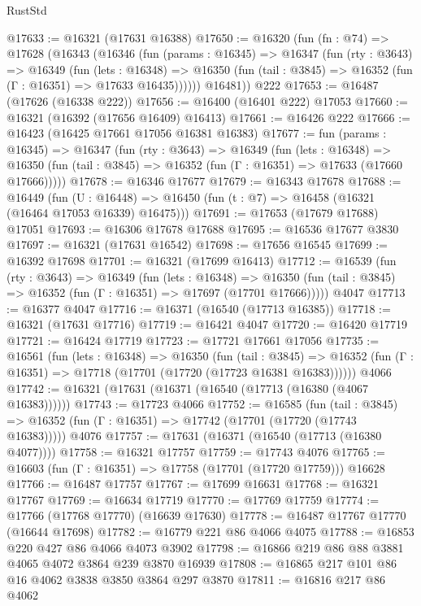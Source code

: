 \begin{lexlean}{RustStd}
\begin{coremodule}
@17633 := @16321 (@17631 @16388)
@17650 := @16320
    (fun (fn : @74) =>
    @17628
      (@16343
        (@16346
          (fun (params : @16345) =>
          @16347
            (fun (rty : @3643) =>
            @16349
              (fun (lets : @16348) =>
              @16350 (fun (tail : @3845) => @16352 (fun (Γ : @16351) => @17633 @16435))))))
        @16481))
    @222
@17653 := @16487 (@17626 (@16338 @222))
@17656 := @16400 (@16401 @222) @17053
@17660 := @16321 (@16392 (@17656 @16409) @16413)
@17661 := @16426 @222
@17666 := @16423 (@16425 @17661 @17056 @16381 @16383)
@17677 := fun (params : @16345) =>
  @16347
    (fun (rty : @3643) =>
    @16349
      (fun (lets : @16348) =>
      @16350 (fun (tail : @3845) => @16352 (fun (Γ : @16351) => @17633 (@17660 @17666)))))
@17678 := @16346 @17677
@17679 := @16343 @17678
@17688 := @16449
    (fun (U : @16448) => @16450 (fun (t : @7) => @16458 (@16321 (@16464 @17053 @16339) @16475)))
@17691 := @17653 (@17679 @17688) @17051
@17693 := @16306 @17678 @17688
@17695 := @16536 @17677 @3830
@17697 := @16321 (@17631 @16542)
@17698 := @17656 @16545
@17699 := @16392 @17698
@17701 := @16321 (@17699 @16413)
@17712 := @16539
    (fun (rty : @3643) =>
    @16349
      (fun (lets : @16348) =>
      @16350 (fun (tail : @3845) => @16352 (fun (Γ : @16351) => @17697 (@17701 @17666)))))
    @4047
@17713 := @16377 @4047
@17716 := @16371 (@16540 (@17713 @16385))
@17718 := @16321 (@17631 @17716)
@17719 := @16421 @4047
@17720 := @16420 @17719
@17721 := @16424 @17719
@17723 := @17721 @17661 @17056
@17735 := @16561
    (fun (lets : @16348) =>
    @16350
      (fun (tail : @3845) =>
      @16352 (fun (Γ : @16351) => @17718 (@17701 (@17720 (@17723 @16381 @16383))))))
    @4066
@17742 := @16321 (@17631 (@16371 (@16540 (@17713 (@16380 (@4067 @16383))))))
@17743 := @17723 @4066
@17752 := @16585
    (fun (tail : @3845) => @16352 (fun (Γ : @16351) => @17742 (@17701 (@17720 (@17743 @16383)))))
    @4076
@17757 := @17631 (@16371 (@16540 (@17713 (@16380 @4077))))
@17758 := @16321 @17757
@17759 := @17743 @4076
@17765 := @16603 (fun (Γ : @16351) => @17758 (@17701 (@17720 @17759))) @16628
@17766 := @16487 @17757
@17767 := @17699 @16631
@17768 := @16321 @17767
@17769 := @16634 @17719
@17770 := @17769 @17759
@17774 := @17766 (@17768 @17770) (@16639 @17630)
@17778 := @16487 @17767 @17770 (@16644 @17698)
@17782 := @16779 @221 @86 @4066 @4075
@17788 := @16853 @220 @427 @86 @4066 @4073 @3902
@17798 := @16866 @219 @86 @88 @3881 @4065 @4072 @3864 @239 @3870 @16939
@17808 := @16865 @217 @101 @86 @16 @4062 @3838 @3850 @3864 @297 @3870
@17811 := @16816 @217 @86 @4062

\end{coremodule}
\end{lexlean}
